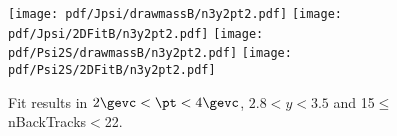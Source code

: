 \begin{figure}[H]
\begin{center}
\texttt{[image: pdf/Jpsi/drawmassB/n3y2pt2.pdf]}
\texttt{[image: pdf/Jpsi/2DFitB/n3y2pt2.pdf]}
\vspace*{-0.5cm}
\texttt{[image: pdf/Psi2S/drawmassB/n3y2pt2.pdf]}
\texttt{[image: pdf/Psi2S/2DFitB/n3y2pt2.pdf]}
\vspace*{-0.5cm}
\end{center}
\caption{Fit results in $2\gevc<\pt<4\gevc$, $2.8<y<3.5$ and 15$\leq$nBackTracks$<$22.}
\label{Fitn3y2pt2}
\end{figure}

